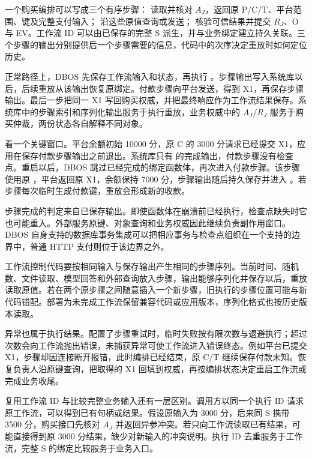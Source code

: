 一个购买编排可以写成三个有序步骤： 读取并核对 $A_J$，返回原 P/C/T、平台范围、键及完整支付输入； 沿这些原值查询或发送； 核验可信结果并提交 $R_J$、O 与 EV。工作流 ID 可以由已保存的完整 S 派生，并与业务绑定建立持久关联。三个步骤的输出分别提供后一个步骤需要的信息，代码中的次序决定重放时如何定位历史。


正常路径上，DBOS 先保存工作流输入和状态，再执行 。步骤输出写入系统库以后，后续重放从该输出恢复原绑定。付款步骤向平台发送，得到 X1，再保存步骤输出。最后一步把同一 X1 写回购买权威，并把最终响应作为工作流结果保存。系统库中的步骤索引和序列化输出服务于执行重放，业务权威中的 $A_J/R_J$ 服务于购买仲裁，两份状态各自解释不同对象。

看一个关键窗口。平台余额初始 10000 分，原 C 的 3000 分请求已经提交 X1，应用在保存付款步骤输出之前退出。系统库只有  的完成输出，付款步骤没有检查点。重启以后，DBOS 跳过已经完成的绑定函数体，再次进入付款步骤。该步骤使用原 ，平台返回原 X1，余额保持 7000 分，步骤输出随后持久保存并进入 。若步骤每次临时生成付款键，重放会形成新的收款。

步骤完成的判定来自已保存输出。即使函数体在崩溃前已经执行，检查点缺失时它也可能重入。外部服务原键、对象查询和业务权威因此继续负责副作用窗口。DBOS 自身支持的数据库事务集成可以把相应事务与检查点组织在一个支持的边界中，普通 HTTP 支付则位于该边界之外。

工作流控制代码要按相同输入与保存输出产生相同的步骤序列。当前时间、随机数、文件读取、模型回答和外部查询放入步骤，输出能够序列化并保存以后，重放读取原值。若在两个原步骤之间随意插入一个新步骤，旧执行的步骤位置可能与新代码错配。部署为未完成工作流保留兼容代码或应用版本，序列化格式也按历史版本读取。

异常也属于执行结果。配置了步骤重试时，临时失败按有限次数与退避执行；超过次数会向工作流抛出错误，未捕获异常可使工作流进入错误终态。例如平台已提交 X1，步骤却因连接断开报错，此时编排已经结束，原 C/T 继续保存付款未知。恢复负责人沿原键查询，把取得的 X1 回填到权威，再按编排状态决定重启工作流或完成业务收尾。

复用工作流 ID 与比较完整业务输入还有一层区别。调用方以同一个执行 ID 请求原工作流，可以得到已有句柄或结果。假设原输入为 3000 分，后来同 S 携带 3500 分，购买接口先核对 $A_J$ 并返回异参冲突。若只向工作流读取已有结果，可能直接得到原 3000 分结果，缺少对新输入的冲突说明。执行 ID 去重服务于工作流，完整 S 的绑定比较服务于业务入口。

